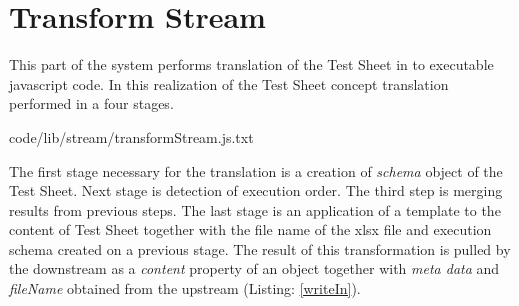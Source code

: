%
%


\section{Transform Stream}
This part of the system performs translation of the Test Sheet in to executable javascript code. In this realization of the Test Sheet concept translation performed in a four stages. 



{code/lib/stream/transformStream.js.txt}

The first stage necessary for the translation is a creation of \textit{schema} object of the Test Sheet. Next stage is detection of execution order. The third step is merging results from previous steps. The last stage is an application of a template to the content of Test Sheet together with the file name of the xlsx file and execution schema created on a previous stage. The result of this transformation is pulled by the downstream as a \textit{content} property of an object together with \textit{meta data} and \textit{fileName} obtained from the upstream (Listing: \ref{writeIn}).

